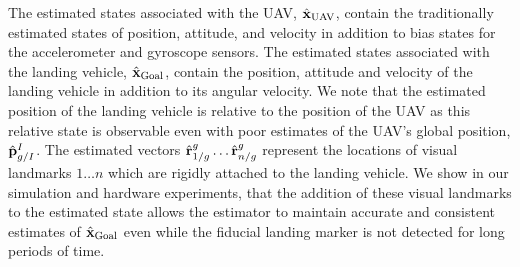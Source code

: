 The estimated states associated with the UAV, $\hat{\boldsymbol{\mathrm{x}}}_{\text{UAV}}$,
contain the traditionally estimated states of position, attitude, and velocity
in addition to bias states for the accelerometer and gyroscope sensors. The
estimated states associated with the landing vehicle,
$\hat{\boldsymbol{\mathrm{x}}}_{\text{Goal}}$, contain the position, attitude and velocity
of the landing vehicle in addition to its angular velocity. We note that the
estimated position of the landing vehicle is relative to the position of the UAV
as this relative state is observable even with poor estimates of the UAV's global
position, $\hat{\boldsymbol{\mathrm{p}}}_{g/I}^I$.
The estimated vectors $\hat{\boldsymbol{\mathrm{r}}}_{1/g}^{g} \dots \hat{\boldsymbol{\mathrm{r}}}_{n/g}^{g}$ represent the
locations of visual landmarks $1 \dots n$ which are rigidly attached to the
landing vehicle. We show in our simulation and hardware experiments, that the
addition of these visual landmarks to the estimated state allows the estimator
to maintain accurate and consistent estimates of $\hat{\boldsymbol{\mathrm{x}}}_{\text{Goal}}$ even
while the fiducial landing marker is not detected for long periods of time. 


